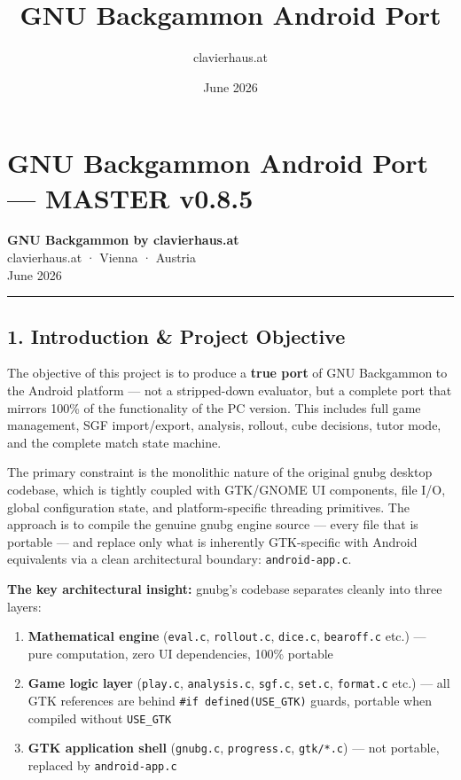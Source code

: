 \documentclass[11pt,a4paper]{article}
\title{\textbf{GNU Backgammon Android Port}}
\author{clavierhaus.at}
\date{June 2026}
\providecommand{\tightlist}{\setlength{\itemsep}{2pt}\setlength{\parskip}{0pt}}
\begin{document}
\maketitle\thispagestyle{fancy}

\tableofcontents\newpage

\section{GNU Backgammon Android Port --- MASTER v0.8.5}\label{gnu-backgammon-android-port-master-v085}

\textbf{GNU Backgammon by clavierhaus.at}\\
clavierhaus.at · Vienna · Austria\\
June 2026

\begin{center}\rule{0.5\linewidth}{0.5pt}\end{center}

\subsection{1. Introduction \& Project Objective}\label{introduction-project-objective}

The objective of this project is to produce a \textbf{true port} of GNU
Backgammon to the Android platform --- not a stripped-down evaluator,
but a complete port that mirrors 100\% of the functionality of the PC
version. This includes full game management, SGF import/export,
analysis, rollout, cube decisions, tutor mode, and the complete match
state machine.

The primary constraint is the monolithic nature of the original gnubg
desktop codebase, which is tightly coupled with GTK/GNOME UI components,
file I/O, global configuration state, and platform-specific threading
primitives. The approach is to compile the genuine gnubg engine source
--- every file that is portable --- and replace only what is inherently
GTK-specific with Android equivalents via a clean architectural
boundary: \texttt{android-app.c}.

\textbf{The key architectural insight:} gnubg's codebase separates
cleanly into three layers:

\begin{enumerate}
\def\labelenumi{\arabic{enumi}.}
\tightlist
\item
  \textbf{Mathematical engine} (\texttt{eval.c}, \texttt{rollout.c},
  \texttt{dice.c}, \texttt{bearoff.c} etc.) --- pure computation, zero
  UI dependencies, 100\% portable
\item
  \textbf{Game logic layer} (\texttt{play.c}, \texttt{analysis.c},
  \texttt{sgf.c}, \texttt{set.c}, \texttt{format.c} etc.) --- all GTK
  references are behind \texttt{\#if\ defined(USE\_GTK)} guards,
  portable when compiled without \texttt{USE\_GTK}
\item
  \textbf{GTK application shell} (\texttt{gnubg.c}, \texttt{progress.c},
  \texttt{gtk/*.c}) --- not portable, replaced by \texttt{android-app.c}
\end{enumerate}
\end{document}
